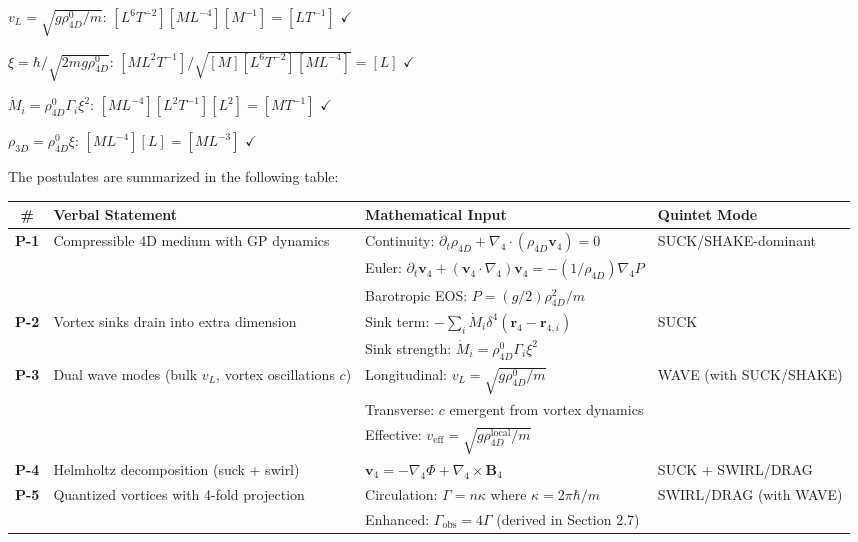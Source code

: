 \begin{tcolorbox}[title=Dimensional Check]
$v_L = \sqrt{g \rho_{4D}^0 / m}$: $[L^6 T^{-2}] [M L^{-4}] [M^{-1}] = [L T^{-1}]$ $\checkmark$

$\xi = \hbar / \sqrt{2 m g \rho_{4D}^0}$: $[M L^2 T^{-1}] / \sqrt{[M] [L^6 T^{-2}] [M L^{-4}]} = [L]$ $\checkmark$

$\dot{M}_i = \rho_{4D}^0 \Gamma_i \xi^2$: $[M L^{-4}] [L^2 T^{-1}] [L^2] = [M T^{-1}]$ $\checkmark$

$\rho_{3D} = \rho_{4D}^0 \xi$: $[M L^{-4}] [L] = [M L^{-3}]$ $\checkmark$
\end{tcolorbox}

The postulates are summarized in the following table:

\begin{table}[H]
\centering
\begin{tabularx}{\textwidth}{|c|Y|Y|Y|}
\hline
\# & Verbal Statement & Mathematical Input & Quintet Mode \\
\hline
\textbf{P-1} & Compressible 4D medium with GP dynamics & Continuity: $\partial_t \rho_{4D} + \nabla_4 \cdot (\rho_{4D} \mathbf{v}_4) = 0$ & SUCK/SHAKE-dominant \\
& & Euler: $\partial_t \mathbf{v}_4 + (\mathbf{v}_4 \cdot \nabla_4) \mathbf{v}_4 = -(1/\rho_{4D}) \nabla_4 P$ &  \\
& & Barotropic EOS: $P = (g/2) \rho_{4D}^2 / m$ &  \\
\hline
\textbf{P-2} & Vortex sinks drain into extra dimension & Sink term: $-\sum_i \dot{M}_i \delta^4(\mathbf{r}_4 - \mathbf{r}_{4,i})$ & SUCK \\
& & Sink strength: $\dot{M}_i = \rho_{4D}^0 \Gamma_i \xi^2$ &  \\
\hline
\textbf{P-3} & Dual wave modes (bulk $v_L$, vortex oscillations $c$) & Longitudinal: $v_L = \sqrt{g \rho_{4D}^0 / m}$ & WAVE (with SUCK/SHAKE) \\
& & Transverse: $c$ emergent from vortex dynamics &  \\
& & Effective: $v_{\text{eff}} = \sqrt{g \rho_{4D}^{\text{local}} / m}$ &  \\
\hline
\textbf{P-4} & Helmholtz decomposition (suck + swirl) & $\mathbf{v}_4 = -\nabla_4 \Phi + \nabla_4 \times \mathbf{B}_4$ & SUCK + SWIRL/DRAG \\
\hline
\textbf{P-5} & Quantized vortices with 4-fold projection & Circulation: $\Gamma = n \kappa$ where $\kappa = 2 \pi \hbar / m$ & SWIRL/DRAG (with WAVE) \\
& & Enhanced: $\Gamma_{\text{obs}} = 4 \Gamma$ (derived in Section 2.7) &  \\

\end{tabularx}
\end{table}
